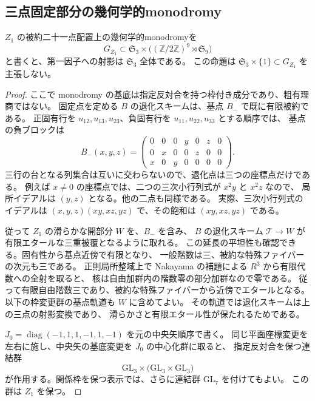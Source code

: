 \subsection{三点固定部分の幾何学的monodromy}
\label{subsec:z1-fixed-monodromy-v26}

\begin{proposition}[固定三点への射影は全対称群]
\label{prop:z1-fixed-monodromy-v26}
$Z_1$ の被約二十一点配置上の幾何学的monodromyを
\[
 G_{Z_1}\subset
 \mathfrak S_3\times\bigl((\mathbb Z/2\mathbb Z)^9\rtimes\mathfrak S_9\bigr)
\]
と書くと、第一因子への射影は $\mathfrak S_3$ 全体である。
この命題は $\mathfrak S_3\times\{1\}\subset G_{Z_1}$ を主張しない。
\end{proposition}

\begin{proof}
ここで monodromy の基底は指定反対合を持つ枠付き成分であり、粗有理商ではない。
固定点を定める $B$ の退化スキームは、基点 $B_-$ で既に有限被約である。
正固有行を $u_{12},u_{13},u_{23}$、負固有行を $u_{11},u_{22},u_{33}$ とする順序では、
基点の負ブロックは
\[
 B_-(x,y,z)=
 \begin{pmatrix}
 0&0&0&y&0&z&0\\
 0&x&0&0&z&0&0\\
 x&0&y&0&0&0&0
 \end{pmatrix}.
\]
三行の台となる列集合は互いに交わらないので、退化点は三つの座標点だけである。
例えば $x\ne0$ の座標点では、二つの三次小行列式が $x^2y$ と $x^2z$ なので、
局所イデアルは $(y,z)$ となる。他の二点も同様である。
実際、三次小行列式のイデアルは
$(x,y,z)(xy,xz,yz)$ で、その飽和は $(xy,xz,yz)$ である。

従って $Z_1$ の滑らかな開部分 $W$ を、$B_-$ を含み、
$B$ の退化スキーム $\mathcal T\to W$ が有限エタールな三重被覆となるように取れる。
この延長の平坦性も確認できる。固有性から基点近傍で有限となり、
一般階数は三、被約な特殊ファイバーの次元も三である。
正則局所整域上で Nakayama の補題による $R^3$ から有限代数への全射を取ると、
核は自由加群内の階数零の部分加群なので零である。
従って有限自由階数三であり、被約な特殊ファイバーから近傍でエタールとなる。
以下の枠変更群の基点軌道も $W$ に含めてよい。
その軌道では退化スキームは上の三点の射影変換であり、
滑らかさと有限エタール性が保たれるためである。

$J_0=\operatorname{diag}(-1,1,1,-1,1,-1)$ を元の中央矢順序で書く。
同じ平面座標変更を左右に施し、中央矢の基底変更を $J_0$ の中心化群に取ると、
指定反対合を保つ連結群
\[
 \mathrm{GL}_3\times
 \bigl(\mathrm{GL}_3\times\mathrm{GL}_3\bigr)
\]
が作用する。関係枠を保つ表示では、さらに連結群 $\mathrm{GL}_7$ を付けてもよい。
この群は $Z_1$ を保つ。


\end{proof}
